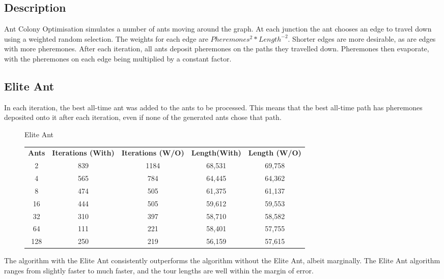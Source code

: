 \documentclass[a4paper, 11pt,table]{article}
\begin{document}
	\subsection{Description}
	Ant Colony Optimisation simulates a number of ants moving around the graph. At each junction the ant chooses an edge to travel down using a weighted random selection. The weights for each edge are $Pheremones^{2}*Length^{-2}$. Shorter edges are more desirable, as are edges with more pheremones. After each iteration, all ants deposit pheremones on the paths they travelled down. Pheremones then evaporate, with the pheremones on each edge being multiplied by a constant factor.
	
	\subsection{Elite Ant}
	In each iteration, the best all-time ant was added to the ants to be processed. This means that the best all-time path has pheremones deposited onto it after each iteration, even if none of the generated ants chose that path.
	
\begin{figure}
	\begin{center}
		Elite Ant
		
		\begin{tabu}{|c c c c c|}
			\textbf{Ants} & \textbf{Iterations (With)} & \textbf{Iterations (W/O)} & \textbf{Length(With)} & \textbf{Length (W/O)} \\
			 2 & 839 & 1184 & 68,531 & 69,758 \\
			 4 & 565 & 784 & 64,445 & 64,362 \\
			 8 & 474 & 505 & 61,375 & 61,137 \\
			 16 & 444 & 505 & 59,612 & 59,553 \\
			 32 & 310 & 397 & 58,710 & 58,582 \\
			 64 & 111 & 221 & 58,401 & 57,755 \\
			 128 & 250 & 219 & 56,159 & 57,615
		\end{tabu}
	\end{center}
\end{figure}
	
	The algorithm with the Elite Ant consistently outperforms the algorithm without the Elite Ant, albeit marginally. The Elite Ant algorithm ranges from slightly faster to much faster, and the tour lengths are well within the margin of error.
	
\end{document}
